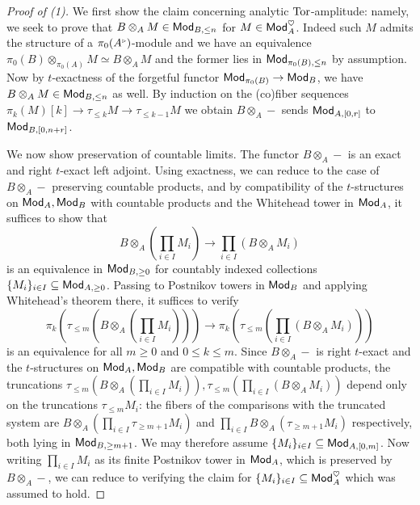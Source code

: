 \begin{proof}[Proof of (1)]
    We first show the claim concerning analytic $\mathrm{Tor}$-amplitude: namely, we seek to prove that $B\otimes_{A}M\in\mathsf{Mod}_{B,\leq n}$ for $M\in\mathsf{Mod}_{A}^{\heartsuit}$. Indeed such $M$ admits the structure of a $\pi_{0}(A^{\tri})$-module and we have an equivalence $\pi_{0}(B)\otimes_{\pi_{0}(A)}M\simeq B\otimes_{A}M$ and the former lies in $\mathsf{Mod}_{\pi_{0}(B),\leq n}$ by assumption. Now by $t$-exactness of the forgetful functor $\mathsf{Mod}_{\pi_{0}(B)}\to\mathsf{Mod}_{B}$, we have $B\otimes_{A}M\in\mathsf{Mod}_{B,\leq n}$ as well. By induction on the (co)fiber sequences $\pi_{k}(M)[k]\to\tau_{\leq k}M\to\tau_{\leq k-1}M$ we obtain $B\otimes_{A}-$ sends $\mathsf{Mod}_{A,[0,r]}$ to $\mathsf{Mod}_{B,[0,n+r]}$. 

    We now show preservation of countable limits. The functor $B\otimes_{A}-$ is an exact and right $t$-exact left adjoint. Using exactness, we can reduce to the case of $B\otimes_{A}-$ preserving countable products, and by compatibility of the $t$-structures on $\mathsf{Mod}_{A},\mathsf{Mod}_{B}$ with countable products and the Whitehead tower in $\mathsf{Mod}_{A}$, it suffices to show that 
    \begin{equation}\label{eqn: countable products}
        B\otimes_{A}\left(\prod_{i\in I}M_{i}\right)\longrightarrow\prod_{i\in I}\left(B\otimes_{A}M_{i}\right)
    \end{equation} 
    is an equivalence in $\mathsf{Mod}_{B,\geq0}$ for countably indexed collections $\{M_{i}\}_{i\in I}\subseteq\mathsf{Mod}_{A,\geq0}$. Passing to Postnikov towers in $\mathsf{Mod}_{B}$ and applying Whitehead's theorem there, it suffices to verify 
    $$\pi_{k}\left(\tau_{\leq m}\left(B\otimes_{A}\left(\prod_{i\in I}M_{i}\right)\right)\right)\to\pi_{k}\left(\tau_{\leq m}\left(\prod_{i\in I}\left(B\otimes_{A}M_{i}\right)\right)\right)$$
    is an equivalence for all $m\geq0$ and $0\leq k\leq m$. Since $B\otimes_{A}-$ is right $t$-exact and the $t$-structures on $\mathsf{Mod}_{A},\mathsf{Mod}_{B}$ are compatible with countable products, the truncations $\tau_{\leq m}\left(B\otimes_{A}\left(\prod_{i\in I}M_{i}\right)\right),\tau_{\leq m}\left(\prod_{i\in I}\left(B\otimes_{A}M_{i}\right)\right)$ depend only on the truncations $\tau_{\leq m}M_{i}$: the fibers of the comparisons with the truncated system are $B\otimes_{A}\left(\prod_{i\in I}\tau_{\geq m+1}M_{i}\right)$ and $\prod_{i\in I}B\otimes_{A}\left(\tau_{\geq m+1}M_{i}\right)$ respectively, both lying in $\mathsf{Mod}_{B,\geq m+1}$. We may therefore assume $\{M_{i}\}_{i\in I}\subseteq\mathsf{Mod}_{A,[0,m]}$. Now writing $\prod_{i\in I}M_{i}$ as its finite Postnikov tower in $\mathsf{Mod}_{A}$, which is preserved by $B\otimes_{A}-$, we can reduce to verifying the claim for $\{M_{i}\}_{i\in I}\subseteq\mathsf{Mod}_{A}^{\heartsuit}$ which was assumed to hold.
\end{proof}
